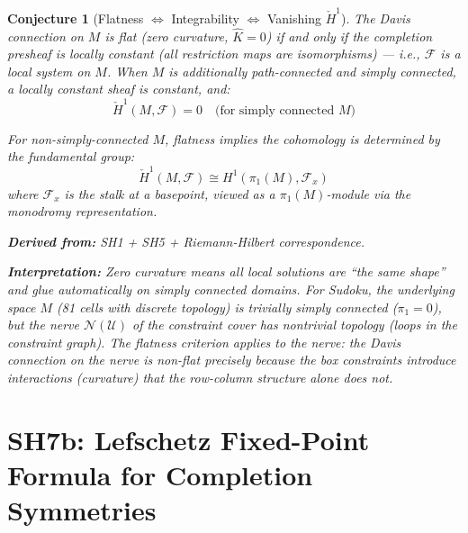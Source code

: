 \documentclass[11pt,letterpaper]{article}
\newtheorem{conjecture}{Conjecture}[section]
\newcommand{\Khat}{\hat{K}}
\newcommand{\Hcech}{\check{H}}
\newcommand{\sheaf}{\mathcal{F}}
\newcommand{\cover}{\mathcal{U}}
\newcommand{\nerve}{\mathcal{N}}
\begin{document}
\begin{conjecture}[Flatness $\iff$ Integrability 
$\iff$ Vanishing $\Hcech^1$]\label{conj:flat}
The Davis connection on $M$ is flat (zero curvature, $\Khat = 0$) if 
and only if the completion presheaf is \emph{locally constant} (all 
restriction maps are isomorphisms) --- i.e., $\sheaf$ is a 
\emph{local system} on $M$. When $M$ is additionally 
\emph{path-connected and simply connected}, a locally constant sheaf 
is constant, and:
\begin{equation}\label{eq:flat_vanishing}
    \Hcech^1(M, \sheaf) = 0 \quad \text{(for simply connected } M
    \text{)}
\end{equation}

For non-simply-connected $M$, flatness implies the cohomology is 
determined by the fundamental group:
\begin{equation}\label{eq:flat_pi1}
    \Hcech^1(M, \sheaf) \cong H^1(\pi_1(M), \sheaf_x)
\end{equation}
where $\sheaf_x$ is the stalk at a basepoint, viewed as a 
$\pi_1(M)$-module via the monodromy representation.

\textbf{Derived from:} SH1 + SH5 + Riemann-Hilbert correspondence.

\textbf{Interpretation:} Zero curvature means all local solutions 
are ``the same shape'' and glue automatically on simply connected 
domains. For Sudoku, the underlying space $M$ (81 cells with 
discrete topology) is trivially simply connected ($\pi_1 = 0$), but 
the \emph{nerve} $\nerve(\cover)$ of the constraint cover has 
nontrivial topology (loops in the constraint graph). The flatness 
criterion applies to the nerve: the Davis connection on the nerve is 
non-flat precisely because the box constraints introduce interactions 
(curvature) that the row-column structure alone does not.
\end{conjecture}

\section{SH7b: Lefschetz Fixed-Point Formula for Completion 
Symmetries}
\end{document}
